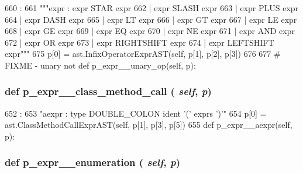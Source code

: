\begin{DoxyCode}
660                                   :
661         """expr : expr STAR  expr
662                 | expr SLASH expr
663                 | expr PLUS  expr
664                 | expr DASH  expr
665                 | expr LT    expr
666                 | expr GT    expr
667                 | expr LE    expr
668                 | expr GE    expr
669                 | expr EQ    expr
670                 | expr NE    expr
671                 | expr AND   expr
672                 | expr OR    expr
673                 | expr RIGHTSHIFT expr
674                 | expr LEFTSHIFT  expr"""
675         p[0] = ast.InfixOperatorExprAST(self, p[1], p[2], p[3])
676 
677     # FIXME - unary not
    def p_expr__unary_op(self, p):
\end{DoxyCode}
\hypertarget{classslicc_1_1parser_1_1SLICC_ae00e73eee817bee36138e741067e1f02}{
\subsubsection[{p\_\-expr\_\-\_\-class\_\-method\_\-call}]{\setlength{\rightskip}{0pt plus 5cm}def p\_\-expr\_\-\_\-class\_\-method\_\-call ( {\em self}, \/   {\em p})}}
\label{classslicc_1_1parser_1_1SLICC_ae00e73eee817bee36138e741067e1f02}



\begin{DoxyCode}
652                                           :
653         "aexpr : type DOUBLE_COLON ident '(' exprs ')'"
654         p[0] = ast.ClassMethodCallExprAST(self, p[1], p[3], p[5])
655 
    def p_expr__aexpr(self, p):
\end{DoxyCode}
\hypertarget{classslicc_1_1parser_1_1SLICC_ac69362630073a12df80172dbc69a3130}{
\subsubsection[{p\_\-expr\_\-\_\-enumeration}]{\setlength{\rightskip}{0pt plus 5cm}def p\_\-expr\_\-\_\-enumeration ( {\em self}, \/   {\em p})}}
\label{classslicc_1_1parser_1_1SLICC_ac69362630073a12df80172dbc69a3130}



